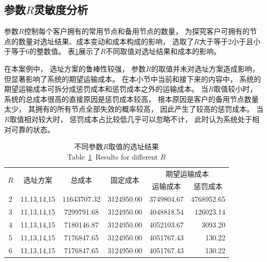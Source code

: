 \subsection{参数\texorpdfstring{$R$}{R}灵敏度分析}

参数$R$控制每个客户拥有的常用节点和备用节点的数量，
为探究客户可拥有的节点的数量对选址结果、成本变动和成本构成的影响，
选取了$R$大于等于2小于且小于等于6的整数值。
表\ref{table:sens_R}展示了$R$不同取值对选址结果和成本的影响。

在本案例中，
选址方案的鲁棒性较强，
参数$R$的取值并未对选址方案造成影响，
但显著影响了系统的期望运输成本。
在本小节中当前和接下来的内容中，
系统的期望运输成本可拆分成惩罚成本和惩罚成本之外的运输成本。
当$R$取值较小时，
系统的总成本很高的直接原因是惩罚成本较高，
根本原因是客户的备用节点数量太少，
其拥有的所有节点全部失效的概率较高，
因此产生了较高的惩罚成本。
当$R$取值相对较大时，
惩罚成本占比较低几乎可以忽略不计，
此时认为系统处于相对可靠的状态。


\begin{table}[htbp]
\renewcommand{\arraystretch}{0.9}
\setlength{\abovecaptionskip}{-0.05cm} %
\setlength{\belowcaptionskip}{-0.2cm} 
\centering
\renewcommand\arraystretch{1}
\caption{不同参数$R$取值的选址结果
		\\Table~\ref{table:sens_R}~Results for different $R$}
	\small{
		\begin{tabular}{cccccr}
			\toprule %
			\multirow{2}[0]{*}{$R$} & \multirow{2}[0]{*}{选址方案} & \multirow{2}[0]{*}{总成本} & \multirow{2}[0]{*}{固定成本} & \multicolumn{2}{c}{期望运输成本} \\
			\cmidrule{5-6}
			&       &       &       & 运输成本  & \multicolumn{1}{c}{惩罚成本} \\
			\midrule
			2     & 11,13,14,15 & 11643707.32 & 3124950.00 & 3749804.67 & 4768952.65  \\
			3     & 11,13,14,15 & 7299791.68 & 3124950.00 & 4048818.54 & 126023.14  \\
			4     & 11,13,14,15 & 7180146.87 & 3124950.00 & 4052103.67 & 3093.20  \\
			5     & 11,13,14,15 & 7176847.65 & 3124950.00 & 4051767.43 & 130.22  \\
			6     & 11,13,14,15 & 7176847.65 & 3124950.00 & 4051767.43 & 130.22  \\
			\bottomrule
		\end{tabular}%
	}
\label{table:sens_R}
\end{table}%

